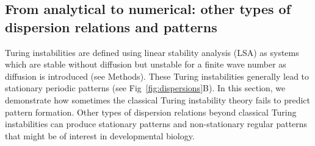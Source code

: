 \documentclass[10pt,letterpaper]{article}
\begin{document}
\subsection*{From analytical to numerical: other types of dispersion relations and patterns} \label{nogrowth}

Turing instabilities are defined using linear stability analysis (LSA) as systems which are stable without diffusion but unstable for a finite wave number as diffusion is introduced (see Methods). These Turing instabilities generally lead to stationary periodic patterns (see Fig~\ref{fig:dispersions}B). In this section, we demonstrate how sometimes the classical Turing instability theory fails to predict pattern formation.
Other types of dispersion relations beyond classical Turing instabilities can produce stationary patterns and non-stationary regular patterns that might be of interest in developmental biology.
\end{document}
